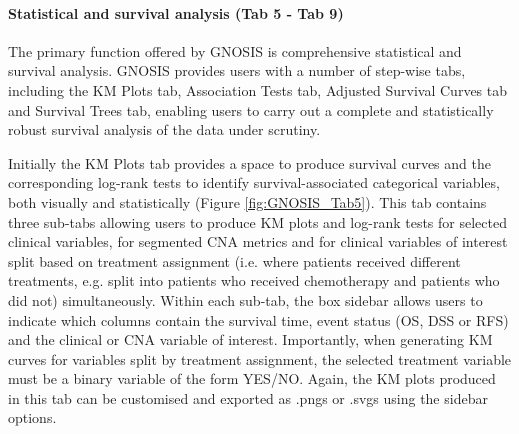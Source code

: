 \paragraph{Statistical and survival analysis (Tab 5 - Tab 9)}
\hfill

\noindent The primary function offered by GNOSIS is comprehensive statistical and survival analysis. GNOSIS provides users with a number of step-wise tabs, including the KM Plots tab, Association Tests tab, Adjusted Survival Curves tab and Survival Trees tab, enabling users to carry out a complete and statistically robust survival analysis of the data under scrutiny.  

Initially the KM Plots tab provides a space to produce survival curves and the corresponding log-rank tests to identify survival-associated categorical variables, both visually and statistically (Figure \ref{fig:GNOSIS_Tab5}). This tab contains three sub-tabs allowing users to produce KM plots and log-rank tests for selected clinical variables, for segmented CNA metrics and for clinical variables of interest split based on treatment assignment (i.e. where patients received different treatments, e.g. split into patients who received chemotherapy and patients who did not) simultaneously. Within each sub-tab, the box sidebar allows users to indicate which columns contain the survival time, event status (OS, DSS or RFS) and the clinical or CNA variable of interest. Importantly, when generating KM curves for variables split by treatment assignment, the selected treatment variable must be a binary variable of the form YES/NO. Again, the KM plots produced in this tab can be customised and exported as .pngs or .svgs using the sidebar options. 

